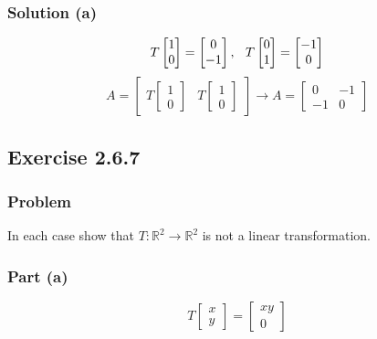 \documentclass[12pt]{article}
\begin{document}
\subsubsection*{Solution (a)}
\[
  T\begin{bmatrix}
    1\\ 
    0 
  \end{bmatrix} = \begin{bmatrix}
  0\\ 
  -1 
  \end{bmatrix}, \hspace{0.1in} T\begin{bmatrix}
  0\\ 
  1 
  \end{bmatrix} = \begin{bmatrix}
  -1\\ 
  0 
  \end{bmatrix}
\]
\[
  A = \begin{bmatrix}
    T\begin{bmatrix}
      1\\ 
      0 
    \end{bmatrix} & T\begin{bmatrix}
      1\\ 
      0 
    \end{bmatrix}
    \end{bmatrix} \longrightarrow A = \begin{bmatrix}
    0 & -1\\ 
    -1 & 0 
  \end{bmatrix}
\]
\vspace{2in}
\subsection*{Exercise 2.6.7}
\subsubsection*{Problem}
In each case show that $T: \mathbb{R}^2 \rightarrow \mathbb{R}^2$ is not a linear transformation. 
\subsubsection*{Part (a)}
\[
  T\begin{bmatrix}
    x\\ 
    y 
  \end{bmatrix} = \begin{bmatrix}
  xy\\ 
  0 
  \end{bmatrix}
\]
\end{document}
